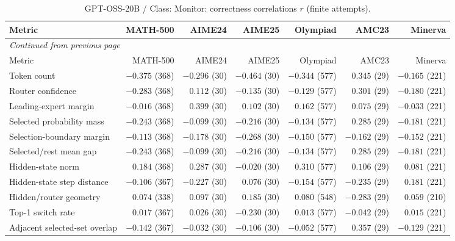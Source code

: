 \begingroup\scriptsize\setlength{\tabcolsep}{4pt}
\begin{longtable}{@{}lrrrrrr@{}}
\caption{GPT-OSS-20B / Class: Monitor: correctness correlations $r$ (finite attempts).}\label{tab:multi-gptoss-class-Monitor}\\
\toprule
Metric & MATH-500 & AIME24 & AIME25 & Olympiad & AMC23 & Minerva \\
\midrule\endfirsthead
\multicolumn{7}{l}{\textit{Continued from previous page}}\\
\toprule
Metric & MATH-500 & AIME24 & AIME25 & Olympiad & AMC23 & Minerva \\
\midrule\endhead
\bottomrule\endfoot
Token count & $-0.375$ (368) & $-0.296$ (30) & $-0.464$ (30) & $-0.344$ (577) & $0.345$ (29) & $-0.165$ (221) \\
Router confidence & $-0.283$ (368) & $0.112$ (30) & $-0.135$ (30) & $-0.129$ (577) & $0.301$ (29) & $-0.180$ (221) \\
Leading-expert margin & $-0.016$ (368) & $0.399$ (30) & $0.102$ (30) & $0.162$ (577) & $0.075$ (29) & $-0.033$ (221) \\
Selected probability mass & $-0.243$ (368) & $-0.099$ (30) & $-0.216$ (30) & $-0.134$ (577) & $0.285$ (29) & $-0.181$ (221) \\
Selection-boundary margin & $-0.113$ (368) & $-0.178$ (30) & $-0.268$ (30) & $-0.150$ (577) & $-0.162$ (29) & $-0.152$ (221) \\
Selected/rest mean gap & $-0.243$ (368) & $-0.099$ (30) & $-0.216$ (30) & $-0.134$ (577) & $0.285$ (29) & $-0.181$ (221) \\
Hidden-state norm & $0.184$ (368) & $0.287$ (30) & $-0.020$ (30) & $0.310$ (577) & $0.106$ (29) & $0.081$ (221) \\
Hidden-state step distance & $-0.106$ (367) & $-0.227$ (30) & $0.076$ (30) & $-0.154$ (577) & $-0.235$ (29) & $0.181$ (221) \\
Hidden/router geometry & $0.074$ (338) & $0.097$ (30) & $0.185$ (30) & $0.080$ (548) & $-0.283$ (29) & $0.059$ (210) \\
Top-1 switch rate & $0.017$ (367) & $0.026$ (30) & $-0.230$ (30) & $0.013$ (577) & $-0.042$ (29) & $0.015$ (221) \\
Adjacent selected-set overlap & $-0.142$ (367) & $-0.032$ (30) & $-0.106$ (30) & $-0.052$ (577) & $0.357$ (29) & $-0.129$ (221) \\
\end{longtable}\endgroup

